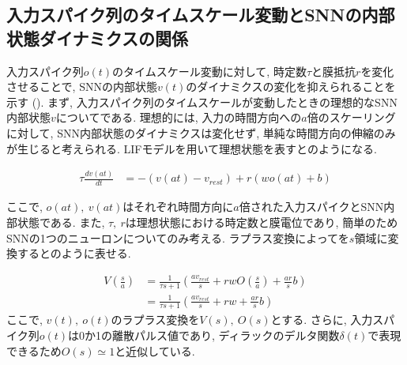 \makeatletter %
\subsection{入力スパイク列のタイムスケール変動とSNNの内部状態ダイナミクスの関係}

入力スパイク列$o(t)$のタイムスケール変動に対して, 時定数$\tau$と膜抵抗$r$を変化させることで, SNNの内部状態$v(t)$のダイナミクスの変化を抑えられることを示す ().
まず, 入力スパイク列のタイムスケールが変動したときの理想的なSNN内部状態$v$についてである.
理想的には, 入力の時間方向への$a$倍のスケーリングに対して, SNN内部状態のダイナミクスは変化せず, 単純な時間方向の伸縮のみが生じると考えられる.
LIFモデルを用いて理想状態を表すとのようになる.

\begin{equation}
    \begin{split}
        \tau \frac{dv(at)}{dt} &= -(v(at)-v_{rest}) + r(w o(at) + b)
    \end{split}
    \label{sec2:eq:ideal}
\end{equation}

ここで, $o(at),~v(at)$はそれぞれ時間方向に$a$倍された入力スパイクとSNN内部状態である.
また, $\tau,~r$は理想状態における時定数と膜電位であり, 簡単のためSNNの1つのニューロンについてのみ考える.
ラプラス変換によってを$s$領域に変換するとのように表せる.

\begin{equation}
    \begin{split}
        V(\frac{s}{a}) &= \frac{1}{\tau s+1}(\frac{a v_{rest}}{s}+r w O(\frac{s}{a})+\frac{ar}{s}b)\\
        &= \frac{1}{\tau s+1}(\frac{a v_{rest}}{s}+r w +\frac{ar}{s}b)
    \end{split}
    \label{sec2:eq:ideal_laplace}
\end{equation}
ここで, $v(t),~o(t)$のラプラス変換を$V(s), ~ O(s)$とする.
さらに, 入力スパイク列$o(t)$は0か1の離散パルス値であり, ディラックのデルタ関数$\delta(t)$で表現できる\cite{Henkes2024}ため$O(s)\simeq1$と近似している.

